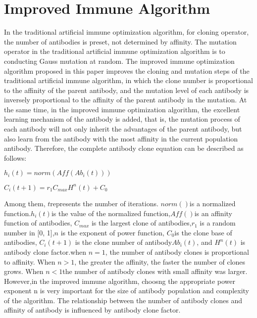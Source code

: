\documentclass{article}
\begin{document}
\section{Improved Immune Algorithm}
In the traditional artificial immune optimization algorithm, for cloning operator, the number of antibodies is preset, not determined by affinity. The mutation operator in the traditional artificial immune optimization algorithm is to conducting Gauss mutation at random.
The improved immune optimization algorithm proposed in this paper improves the cloning and mutation steps of the traditional artificial immune algorithm, in which the clone number is proportional to the affinity of the parent antibody, and the mutation level of each antibody is inversely proportional to the affinity of the parent antibody in the mutation. At the same time, in the improved immune optimization algorithm, the excellent learning mechanism of the antibody is added, that is, the mutation process of each antibody will not only inherit the advantages of the parent antibody, but also learn from the antibody with the most affinity in the current population antibody.
Therefore, the complete antibody clone equation can be described as follows:
  \par\setlength\parindent{7em}
$h_i(t)=norm(Aff(Ab_i(t)))$
\newline
  \par\setlength\parindent{7em}
  \par\setlength\parindent{7em}
$C_i(t+1)=r_1C_{max}H^n(t)+C_0$
\par\setlength\parindent{1em}
Among them, $t$represents the number of iterations. $norm()$is a normalized function.$h_i(t)$is the value of the normalized function,$Aff()$is an affinity function of antibodies, $C_{max}$ is the largest clone of antibodies,$r_1$ is a random number in [0, 1],$n$ is the exponent of power function, $C_0$is the clone base of antibodies, $C_i(t+1)$ is the clone number of antibody$Ab_i(t)$, and $H^n(t)$ is antibody clone factor.when $n=1$, the number of antibody clones is proportional to affinity. When $n> 1$, the greater the affinity, the faster the number of clones grows. When $n<1$the number of antibody clones with small affinity was larger. However,in the improved immune algorithm, choosng the appropriate power exponent n is very important for the size of antibody population and complexity of the algorithm. The relationship between the number of antibody clones and affinity of antibody is influenced by antibody clone factor.
\par\setlength\parindent{1em}
\end{document}
